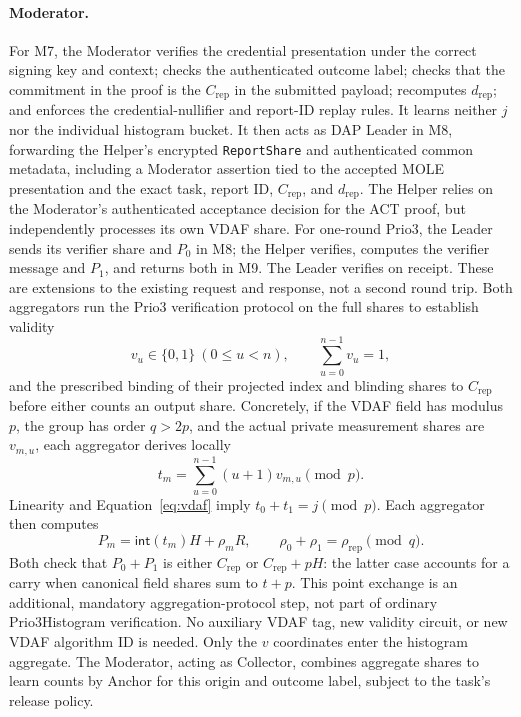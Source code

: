 \documentclass[11pt]{article}
\newcommand{\Crep}{C_{\mathrm{rep}}}
\begin{document}
\paragraph{Moderator.}
For M7, the Moderator verifies the credential presentation under the correct signing
key and context; checks the authenticated outcome label; checks that the
commitment in the proof is the $\Crep$ in the submitted payload; recomputes
$d_{\mathrm{rep}}$; and enforces the credential-nullifier and report-ID
replay rules. It learns neither $j$ nor the individual histogram bucket.
It then acts as DAP Leader in M8, forwarding the Helper's encrypted
\texttt{ReportShare} and authenticated common metadata, including a
Moderator assertion tied to the accepted MOLE presentation and the exact
task, report ID, $\Crep$, and $d_{\mathrm{rep}}$. The Helper relies on the Moderator's
authenticated acceptance decision for the ACT proof, but independently
processes its own VDAF share. For one-round Prio3, the Leader sends its
verifier share and $P_0$ in M8; the Helper verifies, computes the verifier
message and $P_1$, and returns both in M9. The Leader verifies on receipt.
These are extensions to the existing request and response, not a second
round trip. Both aggregators run the
Prio3 verification protocol on
the full shares to establish validity
\begin{equation}
  v_u\in\{0,1\}\ (0\leq u<n),\qquad
  \sum_{u=0}^{n-1}v_u=1,
  \label{eq:vdaf}
\end{equation}
and the prescribed binding of their projected index and blinding shares to
$\Crep$ before either counts an output share. Concretely, if the VDAF field
has modulus $p$, the group has order $q>2p$, and the actual private
measurement shares are $v_{m,u}$, each aggregator derives locally
\begin{equation}
  t_m=\sum_{u=0}^{n-1}(u+1)v_{m,u}\pmod p.
\end{equation}
Linearity and Equation~\eqref{eq:vdaf} imply
$t_0+t_1=j\pmod p$. Each aggregator then computes
\begin{equation}
  P_m=\mathsf{int}(t_m)H+\rho_mR,
  \qquad \rho_0+\rho_1=\rho_{\mathrm{rep}}\pmod q.
\end{equation}
Both check that $P_0+P_1$ is either $\Crep$ or $\Crep+pH$: the latter
case accounts for a carry when canonical field shares sum to $t+p$.
This point exchange is an additional, mandatory aggregation-protocol step,
not part of ordinary Prio3Histogram verification. No auxiliary VDAF tag,
new validity circuit, or new VDAF algorithm ID is needed. Only the $v$
coordinates enter the histogram aggregate. The Moderator, acting as
Collector, combines aggregate shares to learn counts by Anchor for this
origin and outcome label, subject to the task's release policy.
\end{document}
